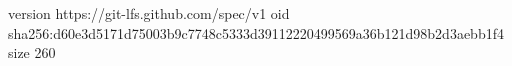 version https://git-lfs.github.com/spec/v1
oid sha256:d60e3d5171d75003b9c7748c5333d39112220499569a36b121d98b2d3aebb1f4
size 260
